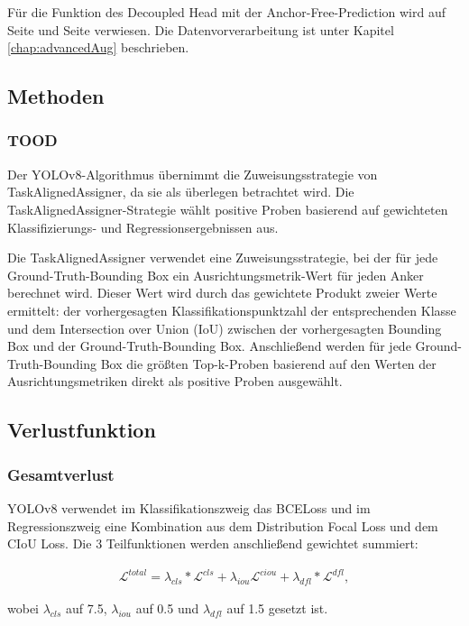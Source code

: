 Für die Funktion des Decoupled Head mit der Anchor-Free-Prediction wird auf Seite \pageref{chap:decoupledHead} und Seite \pageref{chap:anchorFree} verwiesen. Die Datenvorverarbeitung ist unter Kapitel \ref{chap:advancedAug} beschrieben. 

\subsection{Methoden}
\subsubsection{TOOD}
Der YOLOv8-Algorithmus übernimmt die Zuweisungsstrategie von TaskAlignedAssigner, da sie als überlegen betrachtet wird. Die TaskAlignedAssigner-Strategie wählt positive Proben basierend auf gewichteten Klassifizierungs- und Regressionsergebnissen aus. 

Die TaskAlignedAssigner verwendet eine Zuweisungsstrategie, bei der für jede Ground-Truth-Bounding Box ein Ausrichtungsmetrik-Wert für jeden Anker berechnet wird. Dieser Wert wird durch das gewichtete Produkt zweier Werte ermittelt: der vorhergesagten Klassifikationspunktzahl der entsprechenden Klasse und dem Intersection over Union (IoU) zwischen der vorhergesagten Bounding Box und der Ground-Truth-Bounding Box. Anschließend werden für jede Ground-Truth-Bounding Box die größten Top-k-Proben basierend auf den Werten der Ausrichtungsmetriken direkt als positive Proben ausgewählt. \cite{yolov8ModelExplanation, yolov8LabelAssignment}

\subsection{Verlustfunktion}
\subsubsection{Gesamtverlust}
YOLOv8 verwendet im Klassifikationszweig das BCELoss und im Regressionszweig eine Kombination aus dem Distribution Focal Loss und dem CIoU Loss. Die 3 Teilfunktionen werden anschließend gewichtet summiert:

\begin{align}
	\mathcal{L}^{total}=\lambda_{cls}*\mathcal{L}^{cls}+\lambda_{iou}\mathcal{L}^{ciou}+	\lambda_{dfl}*\mathcal{L}^{dfl}, 
\end{align}

wobei $\lambda_{cls}$ auf 7.5, $\lambda_{iou}$ auf 0.5 und $\lambda_{dfl}$ auf 1.5 gesetzt ist.

